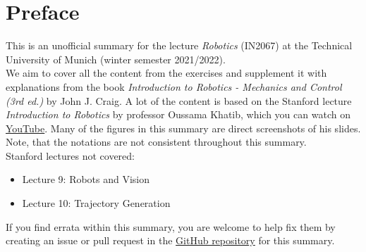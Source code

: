\section{Preface}

\vspace{1 cm}

This is an unofficial summary for the lecture \textit{Robotics} (IN2067) at the Technical University of Munich (winter semester 2021/2022).\\
We aim to cover all the content from the exercises and supplement it with explanations from the book \textit{Introduction to Robotics - Mechanics and Control (3rd ed.)} by John J. Craig. A lot of the content is based on the Stanford lecture \textit{Introduction to Robotics} by professor Oussama Khatib, which you can watch on \href{https://www.youtube.com/playlist?list=PL65CC0384A1798ADF}{YouTube}. Many of the figures in this summary are direct screenshots of his slides. Note, that the notations are not consistent throughout this summary.\\

Stanford lectures not covered:
\begin{itemize}
	\item Lecture 9: Robots and Vision
	\item Lecture 10: Trajectory Generation
\end{itemize}
If you find errata within this summary, you are welcome to help fix them by creating an issue or pull request in the \href{https://github.com/philippwulff/TUM_RCI}{GitHub repository} for this summary.
